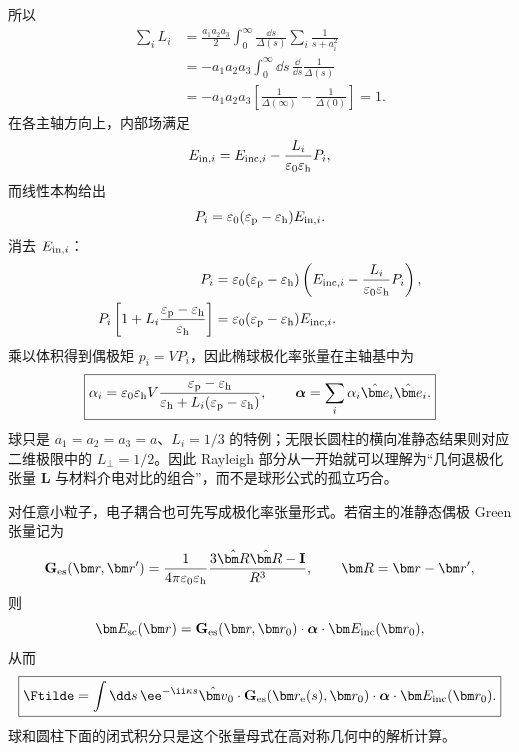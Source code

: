 所以
\begin{align}
\sum_iL_i
&=\frac{a_1a_2a_3}{2}
\int_0^\infty\frac{\dd s}{\Delta(s)}
\sum_i\frac{1}{s+a_i^2}\\
&=-a_1a_2a_3
\int_0^\infty\dd s\,
\frac{\dd}{\dd s}\frac1{\Delta(s)}\\
&=-a_1a_2a_3
\left[\frac1{\Delta(\infty)}-\frac1{\Delta(0)}\right]=1.
\end{align}
在各主轴方向上，内部场满足
\begin{equation}
 E_{{\rm in},i}
 =E_{{\rm inc},i}
 -\frac{L_i}{\varepsilon_0\varepsilon_{\rm h}}P_i,
 \label{eq:ellipsoid-local-field}
\end{equation}
而线性本构给出
\begin{equation}
 P_i=\varepsilon_0(\varepsilon_{\rm p}-\varepsilon_{\rm h})E_{{\rm in},i}.
\end{equation}
消去 $E_{{\rm in},i}$：
\begin{align}
P_i
&=\varepsilon_0(\varepsilon_{\rm p}-\varepsilon_{\rm h})
\left(E_{{\rm inc},i}
-\frac{L_i}{\varepsilon_0\varepsilon_{\rm h}}P_i\right),\\
P_i\left[1+L_i\frac{\varepsilon_{\rm p}-\varepsilon_{\rm h}}
{\varepsilon_{\rm h}}\right]
&=\varepsilon_0(\varepsilon_{\rm p}-\varepsilon_{\rm h})E_{{\rm inc},i}.
\end{align}
乘以体积得到偶极矩 $p_i=VP_i$，因此椭球极化率张量在主轴基中为
\begin{equation}
 \boxed{
 \alpha_i
 =\varepsilon_0\varepsilon_{\rm h}V
 \frac{\varepsilon_{\rm p}-\varepsilon_{\rm h}}
 {\varepsilon_{\rm h}+L_i(\varepsilon_{\rm p}-\varepsilon_{\rm h})},
 \qquad
 \boldsymbol\alpha=\sum_i\alpha_i\hat{\bm e}_i\hat{\bm e}_i.}
 \label{eq:ellipsoid-polarizability}
\end{equation}
球只是 $a_1=a_2=a_3=a$、$L_i=1/3$ 的特例；无限长圆柱的横向准静态结果则对应二维极限中的 $L_\perp=1/2$。因此 Rayleigh 部分从一开始就可以理解为“几何退极化张量 $\boldsymbol L$ 与材料介电对比的组合”，而不是球形公式的孤立巧合。

对任意小粒子，电子耦合也可先写成极化率张量形式。若宿主的准静态偶极 Green 张量记为
\begin{equation}
 \mathbf G_{\rm es}(\bm r,\bm r')
 =\frac{1}{4\pi\varepsilon_0\varepsilon_{\rm h}}
 \frac{3\hat{\bm R}\hat{\bm R}-\mathbf I}{R^3},
 \qquad
 \bm R=\bm r-\bm r',
\end{equation}
则
\begin{equation}
 \bm E_{\rm sc}(\bm r)
 =\mathbf G_{\rm es}(\bm r,\bm r_0)
 \cdot\boldsymbol\alpha\cdot\bm E_{\rm inc}(\bm r_0),
\end{equation}
从而
\begin{equation}
 \boxed{
 \Ftilde
 =\int\dd s\,
 \ee^{-\ii\kappa s}
 \hat{\bm v}_0\cdot
 \mathbf G_{\rm es}(\bm r_{\rm e}(s),\bm r_0)
 \cdot\boldsymbol\alpha\cdot\bm E_{\rm inc}(\bm r_0).}
 \label{eq:rayleigh-general-tensor-trajectory-ellipsoid}
\end{equation}
球和圆柱下面的闭式积分只是这个张量母式在高对称几何中的解析计算。

